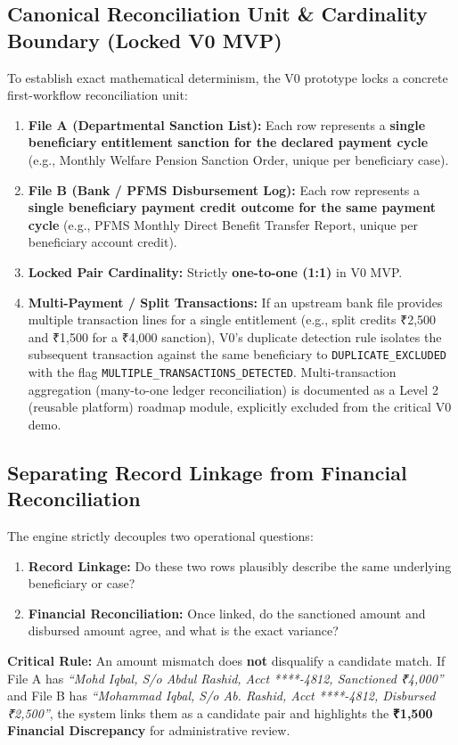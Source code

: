 \documentclass[11pt,a4paper]{article}
\newcommand{\code}[1]{\texttt{#1}}
\begin{document}
\subsection{Canonical Reconciliation Unit \& Cardinality Boundary (Locked V0 MVP)}
To establish exact mathematical determinism, the V0 prototype locks a concrete first-workflow reconciliation unit:
\begin{enumerate}
    \item \textbf{File A (Departmental Sanction List):} Each row represents a \textbf{single beneficiary entitlement sanction for the declared payment cycle} (e.g., Monthly Welfare Pension Sanction Order, unique per beneficiary case).
    \item \textbf{File B (Bank / PFMS Disbursement Log):} Each row represents a \textbf{single beneficiary payment credit outcome for the same payment cycle} (e.g., PFMS Monthly Direct Benefit Transfer Report, unique per beneficiary account credit).
    \item \textbf{Locked Pair Cardinality:} Strictly \textbf{one-to-one (1:1)} in V0 MVP.
    \item \textbf{Multi-Payment / Split Transactions:} If an upstream bank file provides multiple transaction lines for a single entitlement (e.g., split credits ₹2,500 and ₹1,500 for a ₹4,000 sanction), V0's duplicate detection rule isolates the subsequent transaction against the same beneficiary to \code{DUPLICATE\_EXCLUDED} with the flag \code{MULTIPLE\_TRANSACTIONS\_DETECTED}. Multi-transaction aggregation (many-to-one ledger reconciliation) is documented as a Level 2 (reusable platform) roadmap module, explicitly excluded from the critical V0 demo.
\end{enumerate}

\subsection{Separating Record Linkage from Financial Reconciliation}
The engine strictly decouples two operational questions:
\begin{enumerate}
    \item \textbf{Record Linkage:} Do these two rows plausibly describe the same underlying beneficiary or case?
    \item \textbf{Financial Reconciliation:} Once linked, do the sanctioned amount and disbursed amount agree, and what is the exact variance?
\end{enumerate}
\textbf{Critical Rule:} An amount mismatch does \textbf{not} disqualify a candidate match. If File A has \textit{“Mohd Iqbal, S/o Abdul Rashid, Acct ****-4812, Sanctioned ₹4,000”} and File B has \textit{“Mohammad Iqbal, S/o Ab. Rashid, Acct ****-4812, Disbursed ₹2,500”}, the system links them as a candidate pair and highlights the \textbf{₹1,500 Financial Discrepancy} for administrative review.
\end{document}
